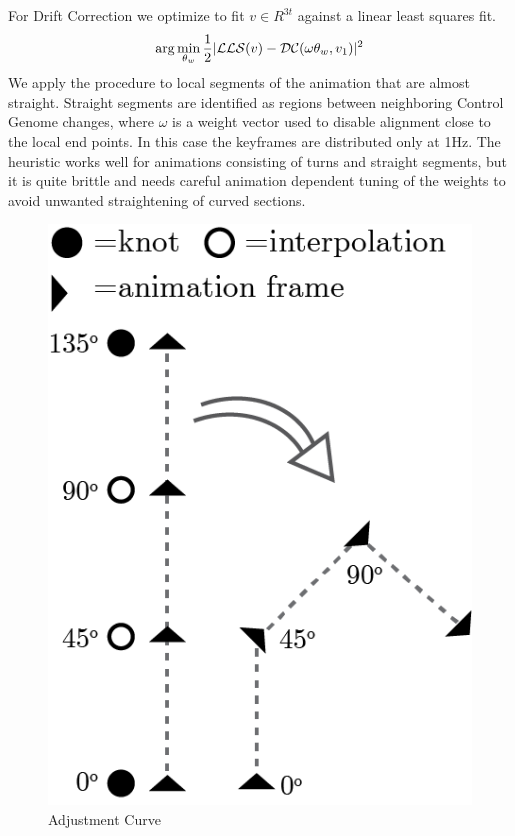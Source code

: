 For Drift Correction we optimize to fit $v \in R^{3t}$ against a linear least squares fit.
\begin{subequations}
\begin{align}
    \arg\min_{\theta_{w}}{
        \frac{1}{2}|\mathcal{LLS}(v)-\mathcal{DC}(\omega\theta_{w},v_1)|^2
    }
\end{align}
\end{subequations}
We apply the procedure to local segments of the animation that are almost straight. Straight segments are identified as regions between neighboring Control Genome changes, where $\omega$ is a weight vector used to disable alignment close to the local end points. In this case the keyframes are distributed only at 1Hz. The heuristic works well for animations consisting of turns and straight segments, but it is quite brittle and needs careful animation dependent tuning of the weights to avoid unwanted straightening of curved sections.
\begin{figure}
    \centering
    \includegraphics[width=0.5\columnwidth]{img/adjustmentcurve.png}
    \caption{Adjustment Curve}
    \label{fig:method:adjustment}
\end{figure}


